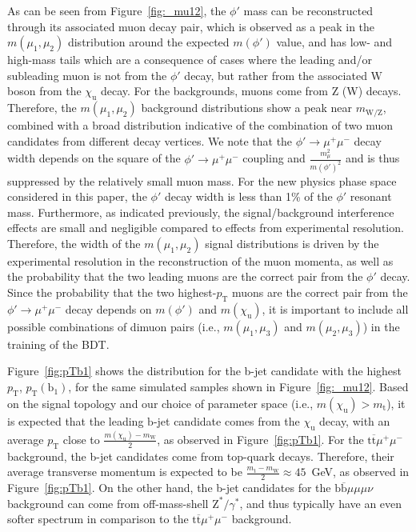 As can be seen from Figure~\ref{fig:_mu12}, the $\phi'$ mass can be reconstructed through its associated muon decay pair, which is observed as a peak in the $m(\mu_{1}, \mu_{2})$ distribution around the expected $m(\phi')$ value, and has low- and high-mass tails which are a consequence of cases where the leading and/or subleading muon is not from the $\phi'$ decay, but rather from the associated $\mathrm{W}$ boson from the $\chi_{\mathrm{u}}$ decay. For the backgrounds, muons come from \textrm{Z} (\textrm{W}) decays. Therefore, the $m(\mu_{1}, \mu_{2})$ background distributions show a peak near $m_{\mathrm{W/Z}}$, combined with a broad distribution indicative of the combination of two muon candidates from different decay vertices. We note that the $\phi'\to\mu^{+}\mu^{-}$ decay width depends on the square of the $\phi'\to\mu^{+}\mu^{-}$ coupling and  $\frac{m_{\mu}^{2}}{m(\phi')^{2}}$ and is thus suppressed by the relatively small muon mass. For the new physics phase space considered in this paper, the $\phi'$ decay width is less than 1\% of the $\phi'$ resonant mass. Furthermore, as indicated previously, the signal/background interference effects are small and negligible compared to effects from experimental resolution. Therefore, the width of the $m(\mu_{1}, \mu_{2})$ signal distributions is driven by the experimental resolution in the reconstruction of the muon momenta, as well as the probability that the two leading muons are the correct pair from the $\phi'$ decay. Since the probability that the two highest-$p_{\mathrm{T}}$ muons are the correct pair from the $\phi'\to\mu^{+}\mu^{-}$ decay depends on $m(\phi')$ and $m(\chi_\mathrm{u})$, it is important to include all possible combinations of dimuon pairs (i.e., $m(\mu_{1}, \mu_{3})$ and $m(\mu_{2}, \mu_{3})$) in the training of the BDT. 

Figure~\ref{fig:pTb1} shows the  distribution for the \textrm{b}-jet candidate with the highest $p_{\mathrm{T}}$, $p_{\mathrm{T}}(\mathrm{b}_1)$, for the same simulated samples shown in Figure~\ref{fig:_mu12}. Based on the signal topology and our choice of parameter space (i.e., $m(\chi_\mathrm{u}) > m_{\mathrm{t}}$), it is expected that the leading $\mathrm{b}$-jet candidate comes from the $\chi_\mathrm{u}$ decay, with an average $p_{\mathrm{T}}$ close to $\frac{m(\chi_\mathrm{u}) - m_{\mathrm{W}}}{2}$, as observed in Figure~\ref{fig:pTb1}. For the $\mathrm{t} \overline{\mathrm{t}} \mu^{+}\mu^{-}$ background, the \textrm{b}-jet candidates come from top-quark decays. Therefore, their average transverse momentum is expected to be $\frac{m_{\mathrm{t}} - m_{\mathrm{W}}}{2} \approx 45$~\textrm{GeV}, as observed in Figure~\ref{fig:pTb1}. On the other hand, the \textrm{b}-jet candidates for the $\mathrm{b} \overline{\mathrm{b}}\mu\mu\mu\nu$ background can come from off-mass-shell $\mathrm{Z}^{*}/\gamma^{*}$, and thus typically have an even softer spectrum in comparison to the $\mathrm{t} \overline{\mathrm{t}} \mu^{+}\mu^{-}$ background.

